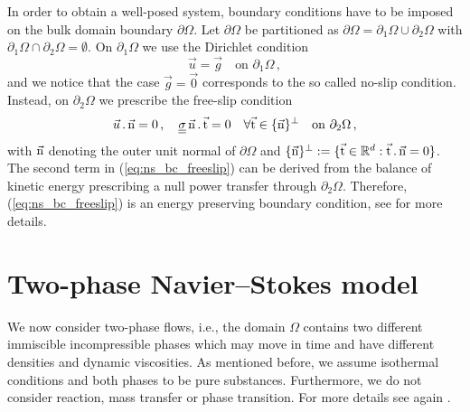 \sloppy In order to obtain a well-posed system, boundary conditions have to be
imposed on the bulk domain boundary $\partial\Omega$. Let $\partial\Omega$ be
partitioned as ${\partial\Omega=\partial_1\Omega \cup \partial_2\Omega}$ with
$\partial_1\Omega \cap \partial_2\Omega = \emptyset$. On $\partial_1 \Omega$
we use the Dirichlet condition
\begin{equation}\label{eq:ns_bc_dirichlet}
\vec u = \vec g \quad \mbox{on } \partial_1 \Omega\,,
\end{equation}
and we notice that the case $\vec g = \vec 0$ corresponds to the so called
no-slip condition. Instead, on $\partial_2 \Omega$ we prescribe the free-slip
condition
\begin{equation}\label{eq:ns_bc_freeslip}
\vec u \,.\,\unitn = 0\,,\quad \mat\sigma\,\unitn\,.\,\unitt = 0
\quad\forall \unitt \in \{\unitn\}^\perp \quad \mbox{on } \partial_2 \Omega\,,
\end{equation}
with $\vec{\rm n}$ denoting the outer unit normal of $\partial \Omega$ and
$\{\vec{\rm n}\}^\perp := \{ \vec{\rm t} \in \mathbb R^d : \vec{\rm t} \,.\,\vec{\rm n} = 0\}$. The
second term in (\ref{eq:ns_bc_freeslip}) can be derived from the balance of
kinetic energy prescribing a null power transfer through $\partial_2\Omega$.
Therefore, (\ref{eq:ns_bc_freeslip}) is an energy preserving boundary condition,
see \cite{Bothe2013} for more details.

\section{Two-phase Navier--Stokes model}\label{sec:two_phase_model}
We now consider two-phase flows, i.e., the domain $\Omega$ contains two
different immiscible incompressible phases which may move in time
and have different densities and dynamic viscosities. As mentioned before, we
assume isothermal conditions and both phases to be pure substances. Furthermore,
we do not consider reaction, mass transfer or phase transition. For more details
see again \cite{GrossR11}.

